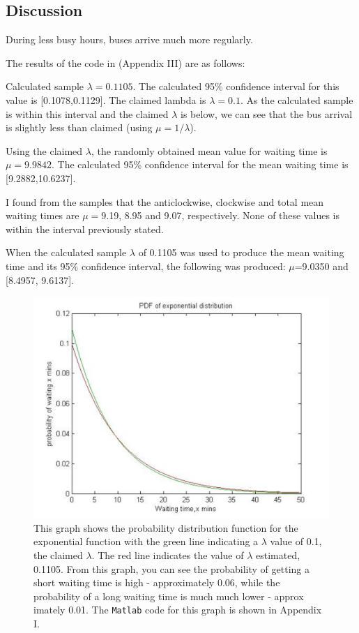 \subsection{Discussion}

During less busy hours, buses arrive much more regularly.

The results of the code in (Appendix III) are as follows:

Calculated sample $\lambda=0.1105$. The calculated 95\% confidence interval for this value is [0.1078,0.1129]. The claimed lambda is $\lambda=0.1$. As the calculated sample is within this interval and the claimed $\lambda$ is below, we can see that the bus arrival is slightly less than claimed (using $\mu=1/\lambda$). 

Using the claimed $\lambda$, the randomly obtained mean value for waiting time is $\mu=9.9842$. The calculated 95\% confidence interval for the mean waiting time is [9.2882,10.6237].

I found from the samples that the anticlockwise, clockwise and total mean waiting times are $\mu=$9.19, 8.95 and 9.07, respectively. None of these values is within the interval previously stated.

When the calculated sample $\lambda$ of 0.1105 was used to produce the mean waiting time and its 95\% confidence interval, the following was produced: $\mu$=9.0350 and [8.4957, 9.6137].
\begin{figure}
 \begin{center}
\includegraphics[width=12cm]{figures/OrbiterBus_Pdf_Exp.pdf}
\caption{This graph shows the probability distribution function for the exponential function with the green line indicating a $\lambda$ value of 0.1, the claimed $\lambda$. The red line indicates the value of $\lambda$ estimated, 0.1105. From this graph, you can see the probability of getting a short waiting time is high - approximately 0.06, while the probability of a long waiting time is much much lower - approx imately 0.01. The {\tt Matlab} code for this graph is shown in Appendix I.}
\end{center}
\end{figure}

